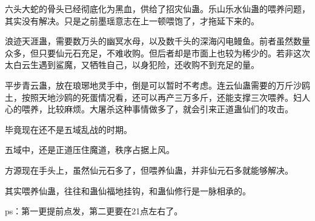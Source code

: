 \begin{this_body}
六头大蛇的骨头已经彻底化为黑血，供给了招灾仙蛊。乐山乐水仙蛊的喂养问题，其实没有解决。只是之前墨瑶意志在上一顿喂饱了，才拖延下来的。

浪迹天涯蛊，需要数万头的幽冥水母，以及数千头的深海闪电鳗鱼。前者虽然数量众多，但只要仙元石充足，不难收购。但后者却是市面上也较为稀少的。若非这次太白云生遇到鲨魔，又牺牲自己，以身犯险，还收购不到充足的量。

平步青云蛊，放在琅琊地灵手中，倒是可以暂时不考虑。连云仙蛊需要的万斤沙鸥土，按照天地沙鸥的死蛋情况看，还可以再产三万多斤，还能支撑三次喂养。妇人心的喂养，比较麻烦。大屠杀这种事情做多了，就会引来正道蛊仙们的攻击。

毕竟现在还不是五域乱战的时期。

五域中，还是正道压住魔道，秩序占据上风。

方源现在手头上，虽然仙元石多了，但喂养仙蛊，并非仙元石多就能够解决。

其实喂养仙蛊，往往和蛊仙福地挂钩，和蛊仙修行是一脉相承的。

ps：第一更提前点发，第二更要在21点左右了。

\end{this_body}


